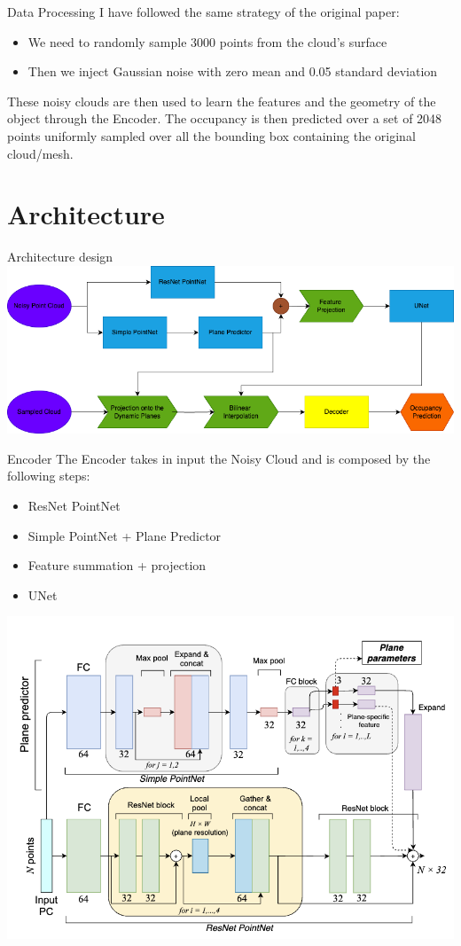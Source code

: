 \documentclass{beamer}
\begin{document}
\begin{frame}{Data Processing}
    I have followed the same strategy of the original paper:
    \begin{itemize}
        \item We need to randomly sample 3000 points from the cloud's surface
        \item Then we inject Gaussian noise with zero mean and 0.05 standard deviation
    \end{itemize}
    These noisy clouds are then used to learn the features and the geometry of the object through the Encoder.
    The occupancy is then predicted over a set of 2048 points uniformly sampled over all the bounding box containing the original cloud/mesh.
\end{frame}

\section{Architecture}

\begin{frame}{Architecture design}
\includegraphics[width=\textwidth]{../media/architecture_pipeline_slides.png}
\end{frame}

\begin{frame}{Encoder}
The Encoder takes in input the Noisy Cloud and is composed by the following steps:
\begin{itemize}
\item ResNet PointNet
\item Simple PointNet + Plane Predictor 
\item Feature summation + projection 
\item UNet
\end{itemize}
\includegraphics[width=\textwidth]{../media/encoder.png}
\end{frame}
\end{document}
